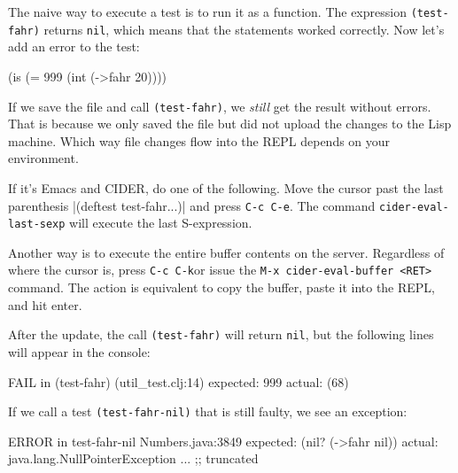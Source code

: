 The naive way to execute a test is to run it as a function. The expression \verb|(test-fahr)| returns \verb|nil|, which means that the statements worked correctly. Now let's add an error to the test:

\begin{english}
  \begin{clojure}
(is (= 999 (int (->fahr 20))))
  \end{clojure}
\end{english}

If we save the file and call \verb|(test-fahr)|, we \emph{still} get the result without errors. That is because we only saved the file but did not upload the changes to the Lisp machine. Which way file changes flow into the REPL depends on your environment.


If it's Emacs and CIDER, do one of the following. Move the cursor past the last parenthesis \spverb|(deftest test-fahr...)| and press \verb|C-c C-e|. The command \texttt{cider\--eval-last-sexp} will execute the last S-expression.

Another way is to execute the entire buffer contents on the server. Regardless of where the cursor is, press \verb|C-c C-k|or issue the \verb|M-x cider-eval-buffer <RET>| command. The action is equivalent to copy the buffer, paste it into the REPL, and hit enter.

After the update, the call \verb|(test-fahr)| will return \verb|nil|, but the following lines will appear in the console:

\begin{english}
  \begin{clojure}
FAIL in (test-fahr) (util_test.clj:14)
expected: 999
  actual: (68)
  \end{clojure}
\end{english}

If we call a test \verb|(test-fahr-nil)| that is still faulty, we see an exception:

\ifnarrow

\begin{english}
  \begin{clojure}
ERROR in test-fahr-nil Numbers.java:3849
expected: (nil? (->fahr nil))
  actual: java.lang.NullPointerException
    ... ;; truncated
  \end{clojure}
\end{english}

\else

\begin{english}
\end{english}

